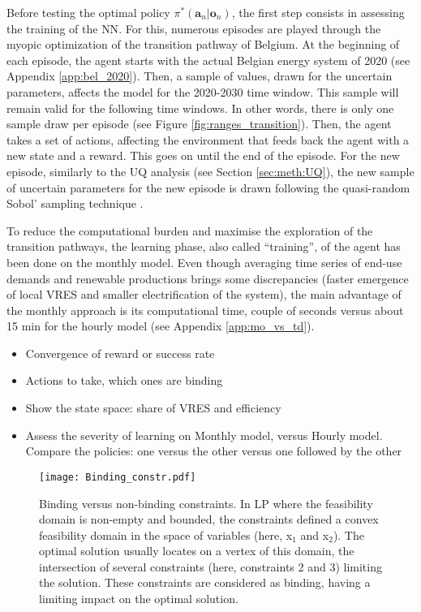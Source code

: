 Before testing the optimal policy $\pi^*\left(\bm{a}_n | \bm{o}_n\right)$, the first step consists in assessing the training of the \gls{NN}. For this, numerous episodes are played through the myopic optimization of the transition pathway of Belgium. At the beginning of each episode, the agent starts with the actual Belgian energy system of 2020 (see Appendix \ref{app:bel_2020}). Then, a sample of values, drawn for the uncertain parameters, affects the model for the 2020-2030 time window. This sample will remain valid for the following time windows. In other words, there is only one sample draw per episode (see Figure \ref{fig:ranges_transition}).  Then, the agent takes a set of actions, affecting the environment that feeds back the agent with a new state and a reward. This goes on until the end of the episode. For the new episode, similarly to the \gls{UQ} analysis (see Section \ref{sec:meth:UQ}), the new sample of uncertain parameters for the new episode is drawn following the quasi-random Sobol' sampling technique \cite{bratley2003implementing}.

To reduce the computational burden and maximise the exploration of the transition pathways, the learning phase, also called ``training'', of the agent has been done on the monthly model. Even though averaging time series of end-use demands and renewable productions brings some discrepancies (\ie faster emergence of local \gls{VRES} and smaller electrification of the system), the main advantage of the monthly approach is its computational time, \ie couple of seconds versus about 15 min for the hourly model (see Appendix \ref{app:mo_vs_td}). 

\begin{itemize}
\item Convergence of reward or success rate
\item Actions to take, which ones are binding
\item Show the state space: share of \gls{VRES} and efficiency
\item Assess the severity of learning on Monthly model, versus Hourly model. Compare the policies: one versus the other versus one followed by the other
\end{itemize}

\begin{figure}[!htbp]
\centering
\texttt{[image: Binding\_constr.pdf]}
\caption{Binding versus non-binding constraints. In \gls{LP} where the feasibility domain is non-empty and bounded, the constraints defined a convex feasibility domain in the space of variables (here, x$_1$ and x$_2$). The optimal solution usually locates on a vertex of this domain, \ie the intersection of several constraints (here, constraints 2 and 3) limiting the solution. These constraints are considered as binding, \ie having a limiting impact on the optimal solution.}
\label{fig:Reward}
\end{figure} 


